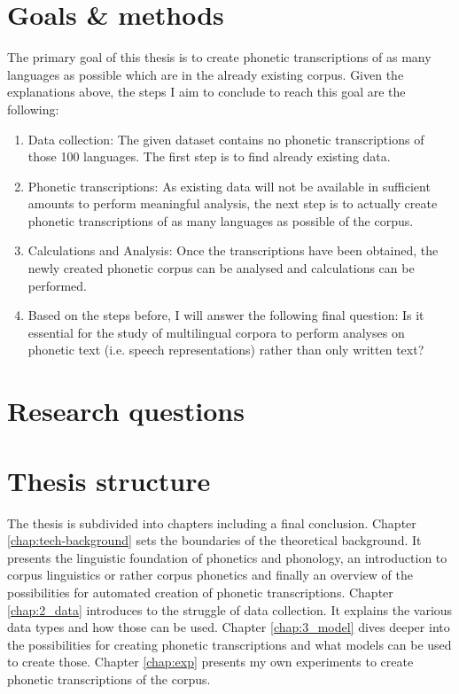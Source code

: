 

\section{Goals \& methods}
The primary goal of this thesis is to create phonetic transcriptions of as many languages as possible which are in the already existing corpus. Given the explanations above, the steps I aim to conclude to reach this goal are the following:
\begin{enumerate}
 \item Data collection: The given dataset contains no phonetic transcriptions of those 100 languages. The first step is to find already existing data. 
 \item Phonetic transcriptions: As existing data will not be available in sufficient amounts to perform meaningful analysis, the next step is to actually create phonetic transcriptions of as many languages as possible of the corpus. 
 \item Calculations and Analysis: Once the transcriptions have been obtained, the newly created phonetic corpus can be analysed and calculations can be performed.
 \item Based on the steps before, I will answer the following final question: Is it essential for the study of multilingual corpora to perform analyses on phonetic text (i.e. speech representations) rather than only written text? 
\end{enumerate}

\section{Research questions}
\label{outline}


\section{Thesis structure}

The thesis is subdivided into  chapters including a final conclusion. Chapter \ref{chap:tech-background} sets the boundaries of the theoretical background. It presents the linguistic foundation of phonetics and phonology, an introduction to corpus linguistics or rather corpus phonetics and finally an overview of the possibilities for automated creation of phonetic transcriptions. Chapter \ref{chap:2_data} introduces to the struggle of data collection. It explains the various data types and how those can be used. Chapter \ref{chap:3_model} dives deeper into the possibilities for creating phonetic transcriptions and what models can be used to create those. Chapter \ref{chap:exp} presents my own experiments to create phonetic transcriptions of the corpus.


